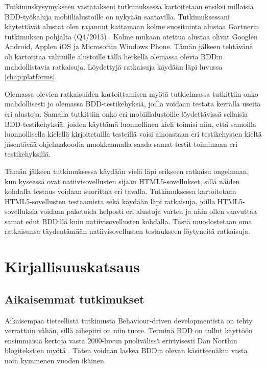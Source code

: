 \documentclass[finnish,nonumbib,nocopyright]{gradu2}
\begin{document}
Tutkimuskysymykseen vastatakseni tutkimuksessa kartoitetaan ensiksi millaisia BDD-työkaluja mobiilialustoille on nykyään saatavilla. Tutkimuksessani käytettävät alustat olen rajannut kattamaan kolme suosituinta alustaa Gartnerin tutkimuksen pohjalta (Q4/2013) \cite{marketshare}. Kolme mukaan otettua alustaa olivat Googlen Android, Applen iOS ja Microsoftin Windows Phone. Tämän jälkeen tehtävänä oli kartoittaa valituille alustoille tällä hetkellä olemassa olevia BDD:n mahdollistavia ratkaisuja. Löydettyjä ratkaisuja käydään läpi luvussa \ref{chap:platforms}.

Olemassa olevien ratkaisuiden kartoittamisen myötä tutkielmassa tutkittiin onko mahdollisesti jo olemassa BDD-testikehyksiä, joilla voidaan testata kerralla useita eri alustoja. Samalla tutkittiin onko eri mobiilialustoille löydettävissä sellaisia BDD-testikehyksiä, joiden käyttämä luonnollinen kieli toimisi niin, että samoilla luonnollisella kielellä kirjoitetuilla testeillä voisi ainoastaan eri testikehysten kieltä jäsentävää ohjelmakoodia muokkaamalla saada samat testit toimimaan eri testikehyksillä.

Tämän jälkeen tutkimuksessa käydään vielä läpi erikseen ratkaisu ongelmaan, kun kyseessä ovat natiivisovellusten sijaan HTML5-sovellukset, sillä näiden kohdalla testaus voidaan suorittaa eri tavalla. Tutkimuksessa kartoitetaan HTML5-sovellusten testaamista sekä käydään läpi ratkaisuja, joilla HTML5-sovelluksia voidaan paketoida helposti eri alustoja varten ja näin ollen saavuttaa samat edut BDD:llä kuin natiivisovellusten kohdalla. Tästä muodostetaan oma ratkaisunsa täydentämään natiivisovellusten testaukseen löytyneitä ratkaisuja.

\chapter{Kirjallisuuskatsaus}

\section{Aikaisemmat tutkimukset}
Aikaisempaa tieteellistä tutkimusta Behaviour-driven developmentista on tehty verrattain vähän, sillä aihepiiri on niin tuore. Terminä BDD on tullut käyttöön ensimmäisiä kertoja vasta 2000-luvun puolivälissä erirtyisesti Dan Northin blogitekstien myötä \cite{bddintro}. Täten voidaan laskea BDD:n olevan käsitteenäkin vasta noin kymmenen vuoden ikäinen.
\end{document}
